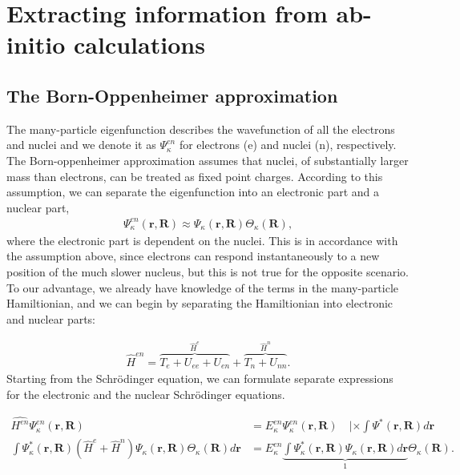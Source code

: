 \chapter{Extracting information from ab-initio calculations}

\section{The Born-Oppenheimer approximation}
\label{appendix:Born-Oppenheimer}

The many-particle eigenfunction describes the wavefunction of all the electrons and nuclei and we denote it as $\Psi_{\kappa}^{en}$ for electrons (e) and nuclei (n), respectively. The Born-oppenheimer approximation assumes that nuclei, of substantially larger mass than electrons, can be treated as fixed point charges. According to this assumption, we can separate the eigenfunction into an electronic part and a nuclear part,
\begin{align}
  \Psi_\kappa^{en}(\textbf{r}, \textbf{R}) \approx \Psi_{\kappa}(\textbf{r}, \textbf{R})\Theta_{\kappa}(\textbf{R}),
\end{align}
where the electronic part is dependent on the nuclei. This is in accordance with the assumption above, since electrons can respond instantaneously to a new position of the much slower nucleus, but this is not true for the opposite scenario. To our advantage, we already have knowledge of the terms in the many-particle Hamiltionian, and we can begin by separating the Hamiltionian into electronic and nuclear parts:


\begin{align}
  \hat{H}^{en} = \overbrace{T_e + U_{ee} + U_{en}}^{\hat{H}^{e}} + \overbrace{T_n + U_{nn}}^{\hat{H}^{n}}.
\end{align}
Starting from the Schrödinger equation, we can formulate separate expressions for the electronic and the nuclear Schrödinger equations.

\begin{align}
  \hat{H^{en}} \Psi_\kappa^{en}(\textbf{r},\textbf{R}) &= E_\kappa^{en}\Psi_\kappa^{en}(\textbf{r},\textbf{R}) \quad \lvert \times \int \Psi^*(\textbf{r},\textbf{R}) d\textbf{r} \\
  \int \Psi_\kappa^*(\textbf{r},\textbf{R}) (\hat{H}^e + \hat{H}^n)\Psi_\kappa(\textbf{r},\textbf{R})\Theta_\kappa(\textbf{R})d\textbf{r} &= E_\kappa^{en} \underbrace{\int \Psi_\kappa ^* (\textbf{r},\textbf{R}) \Psi_\kappa (\textbf{r},\textbf{R}) d\textbf{r}}_{1} \Theta_\kappa(\textbf{R}).
\end{align}

